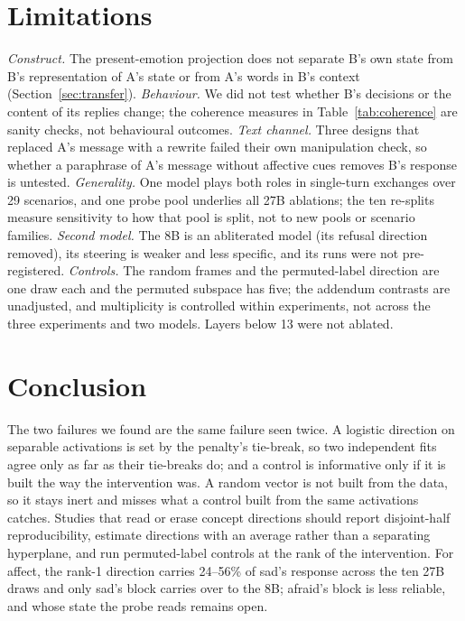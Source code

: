 \documentclass{article}
\begin{document}
\section{Limitations}
\label{sec:limits}
\emph{Construct.} The present-emotion projection does not separate B's own state from B's representation of A's state or from A's words in B's context (Section~\ref{sec:transfer}). \emph{Behaviour.} We did not test whether B's decisions or the content of its replies change; the coherence measures in Table~\ref{tab:coherence} are sanity checks, not behavioural outcomes. \emph{Text channel.} Three designs that replaced A's message with a rewrite failed their own manipulation check, so whether a paraphrase of A's message without affective cues removes B's response is untested. \emph{Generality.} One model plays both roles in single-turn exchanges over 29 scenarios, and one probe pool underlies all 27B ablations; the ten re-splits measure sensitivity to how that pool is split, not to new pools or scenario families. \emph{Second model.} The 8B is an abliterated model (its refusal direction removed), its steering is weaker and less specific, and its runs were not pre-registered. \emph{Controls.} The random frames and the permuted-label direction are one draw each and the permuted subspace has five; the addendum contrasts are unadjusted, and multiplicity is controlled within experiments, not across the three experiments and two models. Layers below 13 were not ablated.

\section{Conclusion}
The two failures we found are the same failure seen twice. A logistic direction on separable activations is set by the penalty's tie-break, so two independent fits agree only as far as their tie-breaks do; and a control is informative only if it is built the way the intervention was. A random vector is not built from the data, so it stays inert and misses what a control built from the same activations catches. Studies that read or erase concept directions should report disjoint-half reproducibility, estimate directions with an average rather than a separating hyperplane, and run permuted-label controls at the rank of the intervention. For affect, the rank-1 direction carries 24--56\% of sad's response across the ten 27B draws and only sad's block carries over to the 8B; afraid's block is less reliable, and whose state the probe reads remains open.
\end{document}
